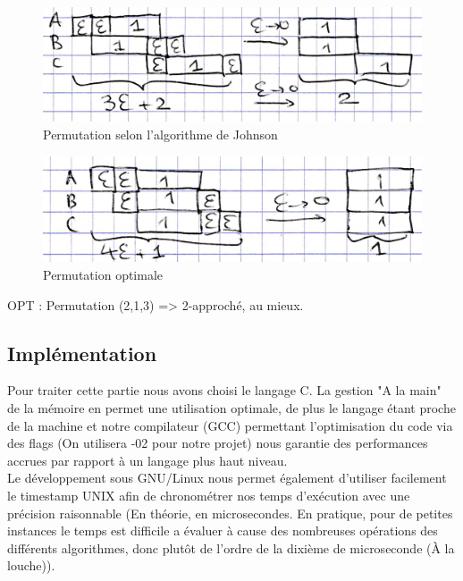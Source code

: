 \documentclass[12pt]{article}
\begin{document}
\begin{figure}[!ht]
\centering
\centerline{\includegraphics[scale=1]{3.jpg}}
\caption{Permutation selon l'algorithme de Johnson}
\label{wspt2}
\end{figure}

\begin{figure}[!ht]
\centering
\centerline{\includegraphics[scale=1]{4.jpg}}
\caption{Permutation optimale}
\label{opt2}
\end{figure}

OPT : Permutation (2,1,3)
=> 2-approché, au mieux.

\subsection{Implémentation}

Pour traiter cette partie nous avons choisi le langage C. La gestion "A la main" de la mémoire en permet une utilisation optimale, de plus le langage étant proche de la machine et notre compilateur (GCC) permettant l'optimisation du code via des flags (On utilisera -02 pour notre projet) nous garantie des performances accrues par rapport à un langage plus haut niveau. \\

Le développement sous GNU/Linux nous permet également d'utiliser facilement le timestamp UNIX afin de chronométrer nos temps d'exécution avec une précision raisonnable (En théorie, en microsecondes. En pratique, pour de petites instances le temps est difficile a évaluer à cause des nombreuses opérations des différents algorithmes, donc plutôt de l'ordre de la dixième de microseconde (À la louche)).\\
\end{document}
